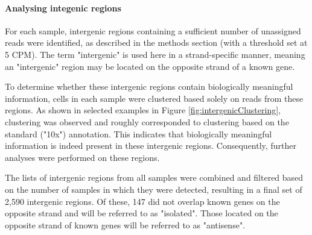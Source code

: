 \paragraph{Analysing integenic regions}

For each sample, intergenic regions containing a sufficient number of unassigned reads were identified,
as described in the methods section (with a threshold set at 5 CPM).
The term "intergenic" is used here in a strand-specific manner,
meaning an "intergenic" region may be located on the opposite strand of a known gene.

To determine whether these intergenic regions contain biologically meaningful information,
cells in each sample were clustered based solely on reads from these regions.
As shown in selected examples in Figure \ref{fig:intergenicClustering},
clustering was observed and roughly corresponded to clustering based on the standard ("10x") annotation.
This indicates that biologically meaningful information is indeed present in these intergenic regions.
Consequently, further analyses were performed on these regions.

The lists of intergenic regions from all samples were combined and filtered based on the number of samples in which they were detected,
resulting in a final set of 2,590 intergenic regions.
Of these, 147 did not overlap known genes on the opposite strand and will be referred to as "isolated".
Those located on the opposite strand of known genes will be referred to as "antisense".

